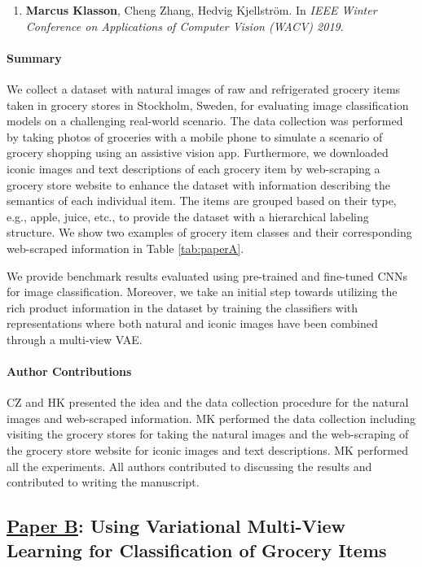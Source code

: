 \begin{enumerate}
	\item[] \textbf{Marcus Klasson}, Cheng Zhang, Hedvig Kjellström. In \textit{IEEE Winter Conference on Applications of Computer Vision (WACV) 2019}.
\end{enumerate}

\paragraph{Summary}
We collect a dataset with natural images of raw and refrigerated grocery items taken in grocery stores in Stockholm, Sweden, for evaluating image classification models on a challenging real-world scenario. The data collection was performed by taking photos of groceries with a mobile phone to simulate a scenario of grocery shopping using an assistive vision app. Furthermore, we downloaded iconic images and text descriptions of each grocery item by web-scraping a grocery store website to enhance the dataset with information describing the semantics of each individual item. The items are grouped based on their type, e.g., apple, juice, etc., to provide the dataset with a hierarchical labeling structure. We show two examples of grocery item classes and their corresponding web-scraped information in Table \ref{tab:paperA}. 

We provide benchmark results evaluated using pre-trained and fine-tuned CNNs for image classification. Moreover, we take an initial step towards utilizing the rich product information in the dataset by training the classifiers with representations where both natural and iconic images have been combined through a multi-view VAE. 


\paragraph{Author Contributions}
CZ and HK presented the idea and the data collection procedure for the natural images and web-scraped information. MK performed the data collection including visiting the grocery stores for taking the natural images and the web-scraping of the grocery store website for iconic images and text descriptions. MK performed all the experiments. All authors contributed to discussing the results and contributed to writing the manuscript. 


\subsection{\underline{Paper B}: Using Variational Multi-View Learning for Classification of Grocery Items}
\label{sec:paperB}

